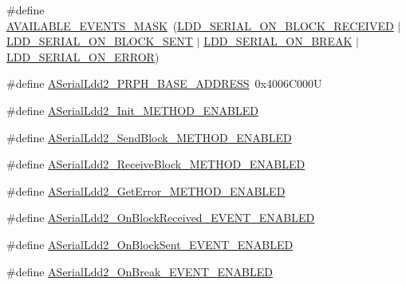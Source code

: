 \begin{DoxyCompactItemize}
\item 
\#define \hyperlink{group___a_serial_ldd2__module_ga5f04a8830cd52a3ffa1678d113f31aee}{A\-V\-A\-I\-L\-A\-B\-L\-E\-\_\-\-E\-V\-E\-N\-T\-S\-\_\-\-M\-A\-S\-K}~(\hyperlink{group___p_e___types__module_ga1bdfbf78e53d634c2d6c0fac21346a9d}{L\-D\-D\-\_\-\-S\-E\-R\-I\-A\-L\-\_\-\-O\-N\-\_\-\-B\-L\-O\-C\-K\-\_\-\-R\-E\-C\-E\-I\-V\-E\-D} $|$ \hyperlink{group___p_e___types__module_gab32dd0cda62049bd256c1b13d6848ebd}{L\-D\-D\-\_\-\-S\-E\-R\-I\-A\-L\-\_\-\-O\-N\-\_\-\-B\-L\-O\-C\-K\-\_\-\-S\-E\-N\-T} $|$ \hyperlink{group___p_e___types__module_ga5791992a91907e5233a850cd45ea8c21}{L\-D\-D\-\_\-\-S\-E\-R\-I\-A\-L\-\_\-\-O\-N\-\_\-\-B\-R\-E\-A\-K} $|$ \hyperlink{group___p_e___types__module_ga22530c977497afda0f11c86bbf869550}{L\-D\-D\-\_\-\-S\-E\-R\-I\-A\-L\-\_\-\-O\-N\-\_\-\-E\-R\-R\-O\-R})
\item 
\#define \hyperlink{group___a_serial_ldd2__module_ga0b40933a9f68fae4f6112ed9a6cfd9ef}{A\-Serial\-Ldd2\-\_\-\-P\-R\-P\-H\-\_\-\-B\-A\-S\-E\-\_\-\-A\-D\-D\-R\-E\-S\-S}~0x4006\-C000\-U
\item 
\#define \hyperlink{group___a_serial_ldd2__module_ga0733c5676cb9059befd74a42eec355a1}{A\-Serial\-Ldd2\-\_\-\-Init\-\_\-\-M\-E\-T\-H\-O\-D\-\_\-\-E\-N\-A\-B\-L\-E\-D}
\item 
\#define \hyperlink{group___a_serial_ldd2__module_ga473316fdf4995cf5d1ecac85c658e5ed}{A\-Serial\-Ldd2\-\_\-\-Send\-Block\-\_\-\-M\-E\-T\-H\-O\-D\-\_\-\-E\-N\-A\-B\-L\-E\-D}
\item 
\#define \hyperlink{group___a_serial_ldd2__module_gada8358a92a4e4793f21bbc76e95ca7cf}{A\-Serial\-Ldd2\-\_\-\-Receive\-Block\-\_\-\-M\-E\-T\-H\-O\-D\-\_\-\-E\-N\-A\-B\-L\-E\-D}
\item 
\#define \hyperlink{group___a_serial_ldd2__module_gad0d7256dc7800d335b9bb2122ae19459}{A\-Serial\-Ldd2\-\_\-\-Get\-Error\-\_\-\-M\-E\-T\-H\-O\-D\-\_\-\-E\-N\-A\-B\-L\-E\-D}
\item 
\#define \hyperlink{group___a_serial_ldd2__module_ga1de13d2017cc0ef844acf2c461975589}{A\-Serial\-Ldd2\-\_\-\-On\-Block\-Received\-\_\-\-E\-V\-E\-N\-T\-\_\-\-E\-N\-A\-B\-L\-E\-D}
\item 
\#define \hyperlink{group___a_serial_ldd2__module_ga7dfcea605c62f020478dd3d4cbf9beb1}{A\-Serial\-Ldd2\-\_\-\-On\-Block\-Sent\-\_\-\-E\-V\-E\-N\-T\-\_\-\-E\-N\-A\-B\-L\-E\-D}
\item 
\#define \hyperlink{group___a_serial_ldd2__module_ga975445b42dc0a4fc37d8683c75c73287}{A\-Serial\-Ldd2\-\_\-\-On\-Break\-\_\-\-E\-V\-E\-N\-T\-\_\-\-E\-N\-A\-B\-L\-E\-D}

\end{DoxyCompactItemize}
